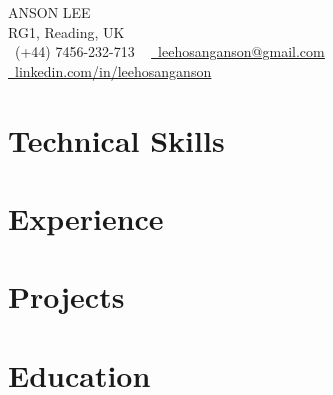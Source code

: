 



\begin{center}
    {\large \scshape ANSON LEE} \\
    \vspace{1pt}
    RG1, Reading, UK \\
    \vspace{1pt}
    \small \raisebox{-0.1\height}\faPhone\ (+44) 7456-232-713
    ~ \href{mailto:leehosanganson@gmail.com}{\raisebox{-0.2\height}\faEnvelope\  \underline{leehosanganson@gmail.com}}
    ~ \href{https://www.linkedin.com/in/leehosanganson}{\raisebox{-0.2\height}\faLinkedin\ \underline{linkedin.com/in/leehosanganson}}
    \vspace{-8pt}
\end{center}

\section{Technical Skills}

\vspace{-16pt}

\section{Experience}

\vspace{-16pt}

\section{Projects}
\vspace{-5pt}

\vspace{-15pt}

\section{Education}


